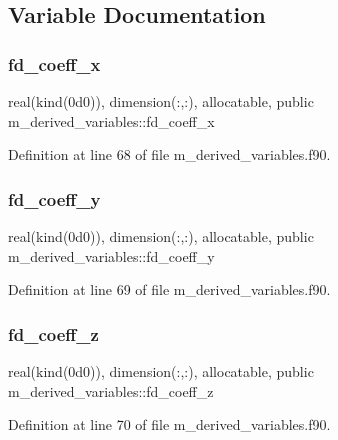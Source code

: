 \subsection{Variable Documentation}
\mbox{\label{namespacem__derived__variables_a4f61d6bef7f53e49a0f5e4a3f9577912}} 
\subsubsection{\texorpdfstring{fd\+\_\+coeff\+\_\+x}{fd\_coeff\_x}}
{\footnotesize\ttfamily real(kind(0d0)), dimension(\+:,\+:), allocatable, public m\+\_\+derived\+\_\+variables\+::fd\+\_\+coeff\+\_\+x}



Definition at line 68 of file m\+\_\+derived\+\_\+variables.\+f90.

\mbox{\label{namespacem__derived__variables_ab273055cd131e3ce73c1f468b78af7b7}} 
\subsubsection{\texorpdfstring{fd\+\_\+coeff\+\_\+y}{fd\_coeff\_y}}
{\footnotesize\ttfamily real(kind(0d0)), dimension(\+:,\+:), allocatable, public m\+\_\+derived\+\_\+variables\+::fd\+\_\+coeff\+\_\+y}



Definition at line 69 of file m\+\_\+derived\+\_\+variables.\+f90.

\mbox{\label{namespacem__derived__variables_a3cafc9204d5773653e119ce3a3b98722}} 
\subsubsection{\texorpdfstring{fd\+\_\+coeff\+\_\+z}{fd\_coeff\_z}}
{\footnotesize\ttfamily real(kind(0d0)), dimension(\+:,\+:), allocatable, public m\+\_\+derived\+\_\+variables\+::fd\+\_\+coeff\+\_\+z}



Definition at line 70 of file m\+\_\+derived\+\_\+variables.\+f90.

